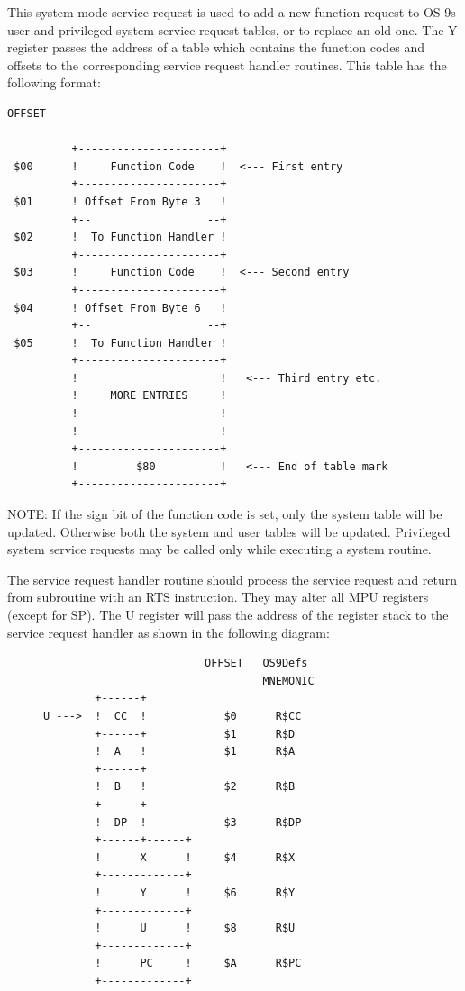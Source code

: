 \documentclass[
]{article}
\begin{document}
This system mode service request is used to add a new function request
to OS-9\textquotesingle s user and privileged system service request
tables, or to replace an old one. The Y register passes the address of a
table which contains the function codes and offsets to the corresponding
service request handler routines. This table has the following format:

\begin{verbatim}
OFFSET

          +----------------------+
 $00      !     Function Code    !  <--- First entry
          +----------------------+
 $01      ! Offset From Byte 3   !
          +--                  --+
 $02      !  To Function Handler !
          +----------------------+
 $03      !     Function Code    !  <--- Second entry
          +----------------------+
 $04      ! Offset From Byte 6   !
          +--                  --+
 $05      !  To Function Handler !
          +----------------------+
          !                      !   <--- Third entry etc.
          !     MORE ENTRIES     !
          !                      !
          !                      !
          +----------------------+
          !         $80          !   <--- End of table mark
          +----------------------+
\end{verbatim}

NOTE: If the sign bit of the function code is set, only the system table
will be updated. Otherwise both the system and user tables will be
updated. Privileged system service requests may be called only while
executing a system routine.

The service request handler routine should process the service request
and return from subroutine with an RTS instruction. They may alter all
MPU registers (except for SP). The U register will pass the address of
the register stack to the service request handler as shown in the
following diagram:

\begin{figure}
\centering
\begin{verbatim}
                         OFFSET   OS9Defs
                                  MNEMONIC
        +------+
U --->  !  CC  !            $0      R$CC
        +------+            $1      R$D
        !  A   !            $1      R$A
        +------+
        !  B   !            $2      R$B
        +------+
        !  DP  !            $3      R$DP
        +------+------+
        !      X      !     $4      R$X
        +-------------+
        !      Y      !     $6      R$Y
        +-------------+
        !      U      !     $8      R$U
        +-------------+
        !      PC     !     $A      R$PC
        +-------------+
\end{verbatim}
\caption{}
\end{figure}
\end{document}
